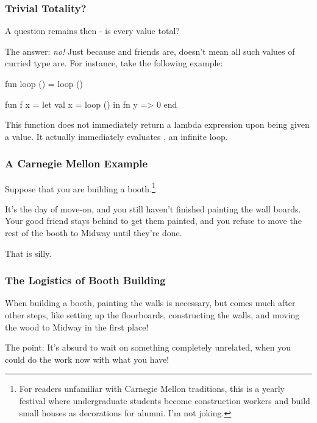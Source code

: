 \documentclass[aspectratio=169]{beamer}
\begin{document}
\begin{frame}[fragile]
  \frametitle{Trivial Totality?}

  A question remains then - is every value  total?

  \pause
  \vspace{\fill}

  The answer: \textit{no!} Just because  and friends are, doesn't mean
  all such values of curried type are. For instance, take the following example:

  \pause
  \begin{codeblock}
    fun loop () = loop ()

    fun f x =
      let
        val x = loop ()
      in
        fn y => 0
      end
  \end{codeblock}

  \pause
  \vspace{\fill}

  This function does not immediately return a lambda expression upon being given a
  value. It actually immediately evaluates , an infinite loop.
\end{frame}

\begin{frame}[fragile]
  \frametitle{A Carnegie Mellon Example}

  Suppose that you are building a booth.\footnote{For readers unfamiliar with
  Carnegie Mellon traditions, this is a yearly festival where undergraduate
  students become construction workers and build small houses as decorations for
  alumni. I'm not joking.}

  \pause
  \vspace{\fill}

  It's the day of move-on, and you still haven't finished painting the wall boards. Your
  good friend stays behind to get them painted, and you refuse to move the rest of
  the booth to Midway until they're done.

  \pause
  \vspace{\fill}

  That is silly.
\end{frame}

\begin{frame}[fragile]
  \frametitle{The Logistics of Booth Building}

  When building a booth, painting the walls is necessary, but comes much after
  other steps, like setting up the floorboards, constructing the walls, and
  moving the wood to Midway in the first place!

  \pause
  \vspace{\fill}

  The point: It's absurd to wait on something completely unrelated, when you
  could do the work now with what you have!
\end{frame}
\end{document}
